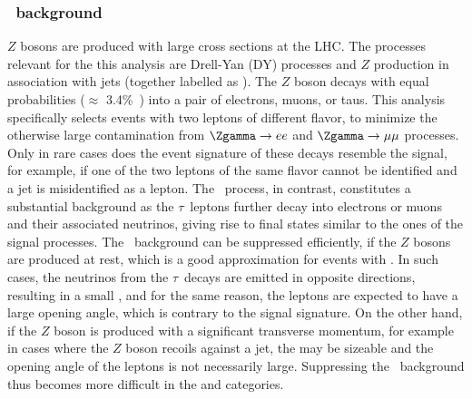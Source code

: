 \subsubsection{\Ztautau\ background}
$Z$ bosons are produced with large cross sections at the LHC. The processes relevant for the this analysis are Drell-Yan (DY) processes and $Z$ production in association with jets (together labelled as \Zgamma).
The $Z$ boson decays with equal probabilities ($\approx$ 3.4\%~\cite{PDG2020}) into a pair of electrons, muons, or taus. 
This analysis specifically selects events with two leptons of different flavor, to minimize the otherwise large contamination from $\Zgamma \to ee$ and $\Zgamma \to \mu\mu$ processes. 
Only in rare cases does the event signature of these decays resemble the signal, for example, if one of the two leptons of the same flavor cannot be identified and a jet is misidentified as a lepton.
The \Ztautau\ process, in contrast, constitutes a substantial background as the $\tau$~leptons further decay into electrons or muons and their associated neutrinos, giving rise to final states similar to the ones of the signal processes. 
The \Ztautau\ background can be suppressed efficiently, if the $Z$ bosons are produced at rest, which is a good approximation for events with \ZeroJet. In such cases, the neutrinos from the $\tau$~decays are emitted in opposite directions, resulting in a small \MET, and for the same reason, the leptons are expected to have a large opening angle, which is contrary to the signal signature. 
On the other hand, if the $Z$ boson is produced with a significant transverse momentum, for example in cases where the $Z$ boson recoils against a jet, the \MET may be sizeable and the opening angle of the leptons is not necessarily large. 
Suppressing the \Ztautau\ background thus becomes more difficult in the \OneJet and \TwoJet categories. 

